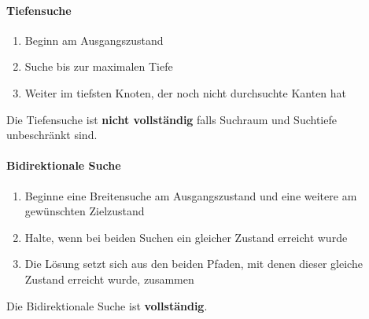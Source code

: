 \paragraph*{Tiefensuche}
\begin{enumerate}
	\item Beginn am Ausgangszustand
	\item Suche bis zur maximalen Tiefe
	\item Weiter im tiefsten Knoten, der noch nicht durchsuchte Kanten hat
\end{enumerate}
Die Tiefensuche ist \textbf{nicht vollständig} falls Suchraum und Suchtiefe unbeschränkt sind.

\paragraph*{Bidirektionale Suche}
\begin{enumerate}
	\item Beginne eine Breitensuche am Ausgangszustand und eine weitere am gewünschten Zielzustand
	\item Halte, wenn bei beiden Suchen ein gleicher Zustand erreicht wurde
	\item Die Lösung setzt sich aus den beiden Pfaden, mit denen dieser gleiche Zustand erreicht wurde, zusammen
\end{enumerate}
Die Bidirektionale Suche ist \textbf{vollständig}.

